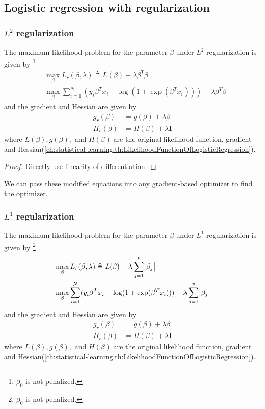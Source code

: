 \begin{refsection}
\subsection{Logistic regression with regularization}
\subsubsection{$L^2$ regularization}
\begin{lemma}
	The maximum likelihood problem for the parameter $\beta$ under $L^2$ regularization is given by \footnote{$\beta_0$ is not penalized.}
	\begin{align*}
	&	\max_{\beta} L_r(\beta,\lambda) \triangleq L(\beta) - \lambda \beta^T\beta \\
	& \max_{\beta} \sum_{i=1}^{N} (y_i\beta^Tx_i - \log(1 + \exp(\beta^Tx_i))) - \lambda \beta^T\beta 
	\end{align*}
	and the gradient and Hessian are given by
	\begin{align}
	g_r(\beta) &= g(\beta)+\lambda\beta \\
	H_r(\beta) &= H(\beta)+\lambda\bm{I}
	\end{align}
	where $L(\beta), g(\beta),$ and $H(\beta)$ are the original likelihood function, gradient and Hessian(\autoref{ch:statistical-learning:th:LikelihoodFunctionOfLogisticRegression}).
\end{lemma}
\begin{proof}
	Directly use linearity of differentiation.
\end{proof}

\begin{remark}
	We can pass these modified equations into any gradient-based optimizer to find the optimizer.	
\end{remark}

\subsubsection{$L^1$ regularization}
\begin{lemma}
	The maximum likelihood problem for the parameter $\beta$ under $L^1$ regularization is given by \footnote{$\beta_0$ is not penalized.}
	\begin{align*}
	&	\max_{\beta} L_r(\beta,\lambda) \triangleq L(\beta) - \lambda \sum_{j=1}^p \abs{\beta_j} \\
	& \max_{\beta} \sum_{i=1}^{N} (y_i\beta^Tx_i - \log(1 + \exp(\beta^Tx_i))) - \lambda \sum_{j=1}^p \abs{\beta_j}
	\end{align*}
	and the gradient and Hessian are given by
	\begin{align}
	g_r(\beta) &= g(\beta)+\lambda\beta \\
	H_r(\beta) &= H(\beta)+\lambda\bm{I}
	\end{align}
	where $L(\beta), g(\beta),$ and $H(\beta)$ are the original likelihood function, gradient and Hessian(\autoref{ch:statistical-learning:th:LikelihoodFunctionOfLogisticRegression}).
\end{lemma}




\end{refsection}
